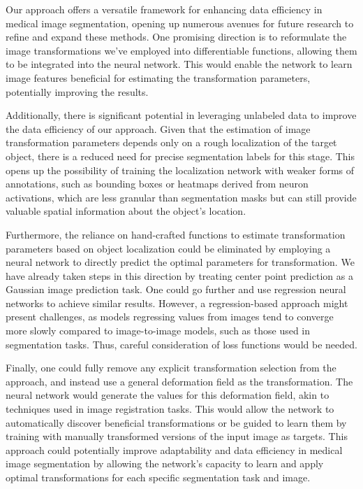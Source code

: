 Our approach offers a versatile framework for enhancing data efficiency in medical image segmentation, opening up numerous avenues for future research to refine and expand these methods. One promising direction is to reformulate the image transformations we've employed into differentiable functions, allowing them to be integrated into the neural network. This would enable the network to learn image features beneficial for estimating the transformation parameters, potentially improving the results.

Additionally, there is significant potential in leveraging unlabeled data to improve the data efficiency of our approach. Given that the estimation of image transformation parameters depends only on a rough localization of the target object, there is a reduced need for precise segmentation labels for this stage. This opens up the possibility of training the localization network with weaker forms of annotations, such as bounding boxes or heatmaps derived from neuron activations, which are less granular than segmentation masks but can still provide valuable spatial information about the object's location.

Furthermore, the reliance on hand-crafted functions to estimate transformation parameters based on object localization could be eliminated by employing a neural network to directly predict the optimal parameters for transformation. We have already taken steps in this direction by treating center point prediction as a Gaussian image prediction task. One could go further and use regression neural networks to achieve similar results. However, a regression-based approach might present challenges, as models regressing values from images tend to converge more slowly compared to image-to-image models, such as those used in segmentation tasks. Thus, careful consideration of loss functions would be needed.

Finally, one could fully remove any explicit transformation selection from the approach, and instead use a general deformation field as the transformation. The neural network would generate the values for this deformation field, akin to techniques used in image registration tasks. This would allow the network to automatically discover beneficial transformations or be guided to learn them by training with manually transformed versions of the input image as targets. This approach could potentially improve adaptability and data efficiency in medical image segmentation by allowing the network's capacity to learn and apply optimal transformations for each specific segmentation task and image.

